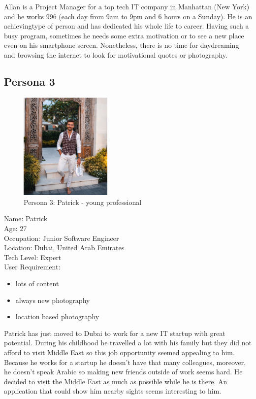 \documentclass[version=last,fontsize=13pt]{scrartcl}
\begin{document}
	Allan is a Project Manager for a top tech IT company in Manhattan (New York) and he works 996 (each day from 9am to 9pm and 6 hours on a Sunday). He is an achievingtype of person and has dedicated his whole life to career. Having such a busy program, sometimes he needs some extra motivation or to see a new place even on his smartphone screen. Nonetheless, there is no time for daydreaming and browsing the internet to look for motivational quotes or photography.

\subsection{Persona 3}


\begin{figure}
		
	\centering
	\includegraphics[width = 0.4\textwidth]{imgs/Patrick.jpg}
	\caption*{Persona 3: Patrick - young professional}


\end{figure}

\noindent
Name: Patrick\\
Age: 27\\
Occupation: Junior Software Engineer\\
Location: Dubai, United Arab Emirates\\
Tech Level: Expert\\
User Requirement:
	\begin{itemize}
		\item lots of content
		\item always new photography
		\item location based photography
	\end{itemize}

Patrick has just moved to Dubai to work for a new IT startup with great potential. During his childhood he travelled a lot with his family but they did not afford to visit Middle East so this job opportunity seemed appealing to him. Because he works for a startup he doesn't have that many colleagues, moreover, he doesn't speak Arabic so making new friends outside of work seems hard. He decided to visit the Middle East as much as possible while he is there. An application that could show him nearby sights seems interesting to him.
\end{document}
